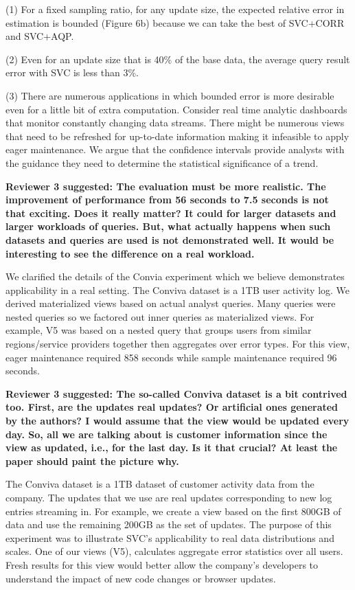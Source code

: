 \noindent (1) For a fixed sampling ratio, for any update size, the expected relative error in estimation is bounded (Figure 6b) because we can take the best of SVC+CORR and SVC+AQP. 

\noindent  (2) Even for an update size that is 40\% of the base data, the average query result error with SVC is less than 3\%.

\noindent  (3) There are numerous applications in which bounded error is more desirable even for a little bit of extra computation. Consider real time analytic dashboards that monitor constantly changing data streams. There might be numerous views that need to be refreshed for up-to-date information making it infeasible to apply eager maintenance. We argue that the confidence intervals provide analysts with the guidance they need to determine the statistical significance of a trend.

\vspace{1.5em}

\textbf{Reviewer 3 suggested: The evaluation must be more realistic. The improvement of performance from 56 seconds to 7.5 seconds is not that exciting. Does it really matter? It could for larger datasets and larger workloads of queries. But, what actually happens when such datasets and queries are used is not demonstrated well. It would be interesting to see the difference on a real workload.}

We clarified the details of the Convia experiment which we believe demonstrates applicability in a real setting. The Conviva dataset is a 1TB user activity log. We derived materialized views based on actual analyst queries. Many queries were nested queries so we factored out inner queries as materialized views. For example, V5 was based on a nested query that groups users from similar regions/service providers together then aggregates over error types. For this view, eager maintenance required 858 seconds while sample maintenance required 96 seconds. 

\vspace{1.5em}

\textbf{Reviewer 3 suggested: The so-called Conviva dataset is a bit contrived too. First, are the updates real updates? Or artificial ones generated by the authors? I would assume that the view would be updated every day. So, all we are talking about is customer information since the view as updated, i.e., for the last day. Is it that crucial? At least the paper should paint the picture why.}

The Conviva dataset is a 1TB dataset of customer activity data from the company. The updates that we use are real updates corresponding to new log entries streaming in. For example, we create a view based on the first 800GB of data and use the remaining 200GB as the set of updates. The purpose of this experiment was to illustrate SVC’s applicability to real data distributions and scales. One of our views (V5), calculates aggregate error statistics over all users. Fresh results for this view would better allow the company's developers to understand the impact of new code changes or browser updates. 

